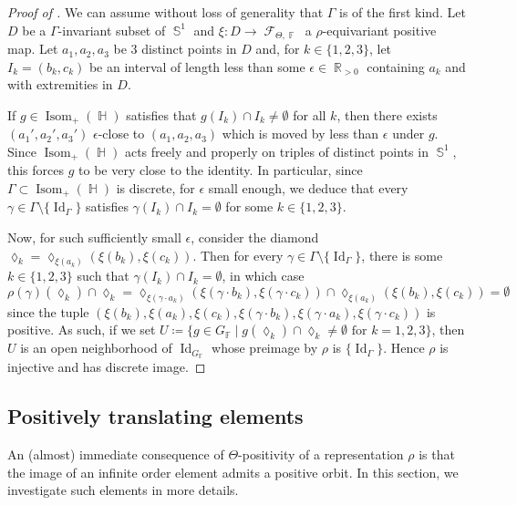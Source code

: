 \documentclass{amsart}
\theoremstyle{plain}
\theoremstyle{definition}
\DeclareMathOperator{\Id}{Id}
\DeclareMathOperator{\Isom}{Isom}
\DeclareMathOperator{\Diam}{\lozenge}
\DeclareMathOperator{\Fc}{\mathcal{F}}
\DeclareMathOperator{\Fb}{{\mathbb{F}}}
\DeclareMathOperator{\Hb}{\mathbb{H}}
\DeclareMathOperator{\Rb}{{\mathbb{R}}}
\DeclareMathOperator{\Sb}{\mathbb{S}}
\newcommand{\1}{\mathbf{1}}
\begin{document}
\begin{proof}[Proof of ]
    We can assume without loss of generality that $\Gamma$ is of the first kind. Let $D$ be a $\Gamma$-invariant subset of $\Sb^1$ and $\xi:D \to \Fc_{\Theta,\Fb}$ a $\rho$-equivariant positive map. Let $a_1,a_2,a_3$ be $3$ distinct points in $D$ and, for $k\in \{1,2,3\}$, let $I_k = (b_k,c_k)$ be an interval of length less than some $\epsilon \in \Rb_{>0}$ containing $a_k$ and with extremities in $D$.

    If $g\in \Isom_+(\Hb)$ satisfies that $g(I_k)\cap I_k \neq \emptyset$ for all $k$, then there exists $(a_1',a_2',a_3')$ $\epsilon$-close to $(a_1,a_2,a_3)$ which is moved by less than $\epsilon$ under $g$. Since $\Isom_+(\Hb)$ acts freely and properly on triples of distinct points in $\Sb^1$, this forces $g$ to be very close to the identity. In particular, since $\Gamma\subset\Isom_+(\Hb)$ is discrete, for $\epsilon$ small enough, we deduce that every $\gamma\in \Gamma\setminus \{\Id_\Gamma\}$ satisfies $\gamma(I_k)\cap I_k = \emptyset$ for some $k\in \{1,2,3\}$.

    Now, for such sufficiently small $\epsilon$, consider the diamond $\Diam_k = \Diam_{\xi(a_k)}(\xi(b_k), \xi(c_k))$. Then for every $\gamma \in \Gamma\setminus \{\Id_\Gamma\}$, there is some $k\in \{1,2,3\}$ such that $\gamma(I_k)\cap I_k = \emptyset$, in which case  
    \[\rho(\gamma)(\Diam_k) \cap \Diam_k = \Diam_{\xi(\gamma\cdot a_k)}(\xi(\gamma\cdot b_k), \xi(\gamma\cdot c_k)) \cap \Diam_{\xi(a_k)}(\xi(b_k), \xi(c_k)) = \emptyset\]
    since the tuple $(\xi(b_k), \xi(a_k), \xi(c_k), \xi(\gamma \cdot b_k), \xi(\gamma \cdot a_k), \xi(\gamma \cdot c_k))$ is positive. As such, if we set $U\coloneqq \{g\in G_{\Fb} \mid g(\Diam_k)\cap \Diam_k \neq \emptyset \textrm{ for } k=1,2,3\}$, then $U$ is an open neighborhood of $\Id_{G_{\Fb}}$ whose preimage by $\rho$ is $\{\Id_\Gamma\}$. Hence $\rho$ is injective and has discrete image.
\end{proof}




\subsection{Positively translating elements}
\label{subsec:PosTranslElem}

An (almost) immediate consequence of $\Theta$-positivity of a representation $\rho$ is that the image of an infinite order element admits a positive orbit. In this section, we investigate such elements in more details.
\end{document}
